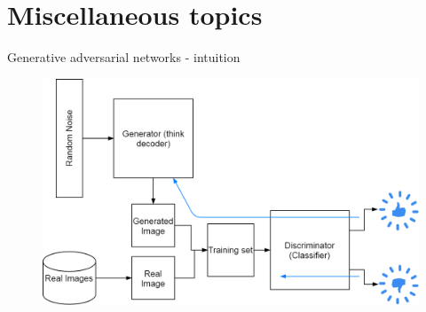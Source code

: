 \section{Miscellaneous topics}
\begin{frame}{Generative adversarial networks - intuition}
\begin{center}
	\begin{figure}
		\includegraphics[width=1\textwidth]{figures/gan-simple}
	\end{figure}
\end{center}
\end{frame}

